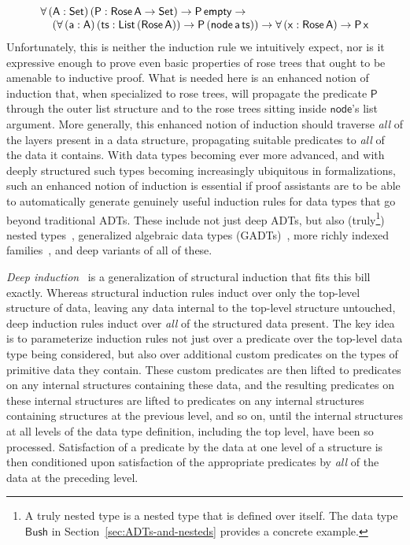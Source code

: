 \documentclass[9pt]{entcs}
\begin{document}
\[\begin{array}{l}
\mathsf{\forall\, (A : Set)\,(P : Rose\,A \to Set) \to P\,empty \to}\\
\mathsf{\hspace*{0.15in}
 (\forall\, (a : A)\,(ts :
  List\,(Rose\,A)) \to P\,(node\,a\,ts)) \to 
  \forall \,(x : Rose\,A) \to P\,x}
\end{array}\]
\noindent
Unfortunately, this is neither the induction rule we intuitively
expect, nor is it expressive enough to prove even basic properties of
rose trees that ought to be amenable to inductive proof. What is
needed here is an enhanced notion of induction that, when specialized
to rose trees, will propagate the predicate $\mathsf{P}$ through the
outer list structure and to the rose trees sitting inside
$\mathsf{node}$'s list argument. More generally, this enhanced notion
of induction should traverse {\em all} of the layers present in a data
structure, propagating suitable predicates to {\em all} of the data it
contains.  With data types becoming ever more advanced, and with
deeply structured such types becoming increasingly ubiquitous in
formalizations, such an enhanced notion of induction is essential if
proof assistants are to be
able to automatically generate genuinely useful induction rules for
data types that go
beyond traditional ADTs. These
include not just deep ADTs, but also (truly\footnote{A truly nested
  type is a nested type that is defined over itself. The data type
  $\mathsf{Bush}$ in Section~\ref{sec:ADTs-and-nesteds} provides a
  concrete example.}) nested types~\cite{bm98},
generalized algebraic data types
(GADTs)~\cite{ch03,pvww06,sp04,xcc03}, more richly indexed
families~\cite{dyb94}, and deep variants of all of these.

{\em Deep induction}~\cite{jp20} is a generalization of structural
induction that fits this bill exactly. Whereas structural induction
rules induct over only the top-level structure of data, leaving any
data internal to the top-level structure untouched, deep induction
rules induct over {\em all} of the structured data present. The key
idea is to parameterize induction rules not just over a predicate over
the top-level data type being considered, but also over additional
custom predicates on the types of primitive data they contain. These
custom predicates are then lifted to predicates on any internal
structures containing these data, and the resulting predicates on
these internal structures are lifted to predicates on any internal
structures containing structures at the previous level, and so on,
until the internal structures at all levels of the data type
definition, including the top level, have been so
processed. Satisfaction of a predicate by the data at one level of a
structure is then conditioned upon satisfaction of the appropriate
predicates by {\em all} of the data at the preceding level.
\end{document}
